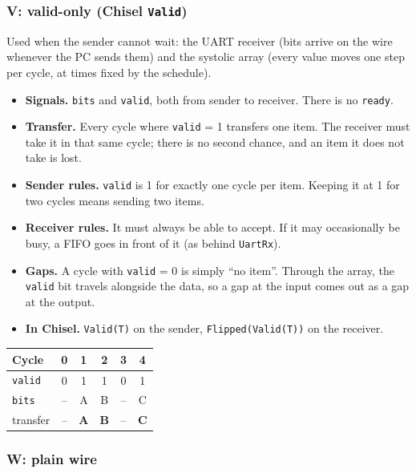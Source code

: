 \documentclass{article}
\begin{document}
\subsubsection*{V: valid-only (Chisel \texttt{Valid})}

Used when the sender cannot wait: the UART receiver (bits arrive on the wire whenever the PC sends them)
and the systolic array (every value moves one step per cycle, at times fixed by the schedule).

\begin{itemize}
  \item \textbf{Signals.} \texttt{bits} and \texttt{valid}, both from sender to receiver. There is no \texttt{ready}.
  \item \textbf{Transfer.} Every cycle where \texttt{valid} = 1 transfers one item. The receiver must take it in that
        same cycle; there is no second chance, and an item it does not take is lost.
  \item \textbf{Sender rules.} \texttt{valid} is 1 for exactly one cycle per item. Keeping it at 1 for two cycles
        means sending two items.
  \item \textbf{Receiver rules.} It must always be able to accept. If it may occasionally be busy, a FIFO goes in
        front of it (as behind \texttt{UartRx}).
  \item \textbf{Gaps.} A cycle with \texttt{valid} = 0 is simply ``no item''. Through the array, the \texttt{valid} bit
        travels alongside the data, so a gap at the input comes out as a gap at the output.
  \item \textbf{In Chisel.} \texttt{Valid(T)} on the sender, \texttt{Flipped(Valid(T))} on the receiver.
\end{itemize}

\begin{center}\small
\begin{tabular}{l ccccc}
  \toprule
  Cycle            & 0 & 1 & 2 & 3 & 4 \\
  \midrule
  \texttt{valid}   & 0 & 1 & 1 & 0 & 1 \\
  \texttt{bits}    & -- & A & B & -- & C \\
  transfer         & -- & \textbf{A} & \textbf{B} & -- & \textbf{C} \\
  \bottomrule
\end{tabular}
\end{center}

\subsubsection*{W: plain wire}
\end{document}
